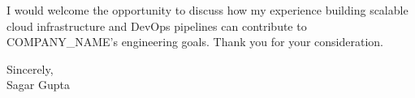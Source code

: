 \documentclass[a4paper,11pt]{article}
\begin{document}
\vspace{3mm}
\noindent
I would welcome the opportunity to discuss how my experience building scalable cloud infrastructure and DevOps pipelines can contribute to COMPANY\_NAME's engineering goals. Thank you for your consideration.

\vspace{6mm}
\noindent
Sincerely, \\
Sagar Gupta
\end{document}
